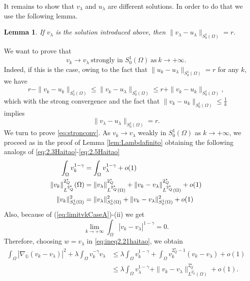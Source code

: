 \documentclass[11pt]{amsart}
\numberwithin{equation}{section} %
\newtheorem{lemma}[teo]{Lemma}
\theoremstyle{definition}
\def\G{\mathbb{G}}
\newcommand{\m}{\mbox}
\begin{document}
\color{black}

It remains to show that $v_\lambda$ and $u_\lambda$ are different solutions.
In order to do that we use the following lemma.

\begin{lemma}\label{lem:casoa2}
	If $v_\lambda$ is the solution introduced above,
	then $\|v_\lambda-u_\lambda\|_{S^{1}_{0}(\Omega)}=r$.
\end{lemma}
\proof 
We want to prove that 
\begin{equation}\label{eq:stronconv}
	v_k\to v_\lambda\ \m{strongly in }S_0^1(\Omega)\ \m{as}\ k\to+\infty.
\end{equation}
Indeed, if this is the case, owing to the fact that $\|u_k-u_\lambda\|_{S^{1}_{0}(\Omega)}=r$ for any $k$,
we have
\[
r-\|v_k-u_k\|_{S^{1}_{0}(\Omega)} \leq \|v_k-u_\lambda\|_{S^{1}_{0}(\Omega)} \leq r+\|v_k-u_k\|_{S^{1}_{0}(\Omega)},
\]
which with the strong convergence and the fact that $\|v_k-u_k\|_{S^{1}_{0}(\Omega)}\leq \frac{1}{k}$
implies 
$$\|v_\lambda-u_\lambda\|_{S^{1}_{0}(\Omega)}=r.$$
We turn to prove \eqref{eq:stronconv}. 
As $v_k\to v_\lambda$ weakly in $S_0^1(\Omega)$ as $k\to+\infty$,
we proceed as in the proof of
Lemma \ref{lem:Lambdafinito} obtaining the following analogs of 
\eqref{eq:2.3Haitao}-\eqref{eq:2.5Haitao}
\begin{align}
	\int_\Omega v_k^{1-\gamma}&=\int_\Omega v_\lambda^{1-\gamma}+o(1)\label{eq:case1concl1}\\
	\vspace{9pt}
	\| v_k\|^{2^\star_Q}_{L^{2^\star_Q}}(\Omega)&=\|v_\lambda\|_{L^{2^\star_Q}(\Omega)}^{2^\star_Q}+
	\|v_k-v_\lambda\|_{L^{2^\star_Q}(\Omega)}^{2^\star_Q}+o(1)\\
	\|v_k\|_{S^{1}_{0}(\Omega)}^2&=\|v_\lambda\|_{S^{1}_{0}(\Omega)}^2+\|v_k-v_\lambda\|_{S^{1}_{0}(\Omega)}^2+o(1)\label{eq:case1concl2}
\end{align}
Also, because of (\ref{eq:limitvkCaseA})-(ii)
we get
\begin{equation}\label{eq:case1concl3}
	\lim_{k\to+\infty}\int_\Omega|v_k-v_\lambda|^{1-\gamma}=0.
\end{equation}
Therefore, choosing $w=v_\lambda$ in \eqref{eq:ineq2.21haitao},
we obtain
\[
\begin{split}
	\int_\Omega|\nabla_\G(v_k-v_\lambda)|^2+\lambda\int_\Omega v_k^{-\gamma}v_\lambda
	&\leq \lambda\int_\Omega v_k^{1-\gamma}+\int_\Omega v_k^{2^\star_Q-1}(v_k-v_\lambda)+o(1)\\
	&\leq \lambda\int_\Omega v_\lambda^{1-\gamma}+\|v_k-v_\lambda\|_{L^{2^\star_Q}(\Omega)}^{2^\star_Q}+o(1).	
\end{split}
\]
\end{document}
